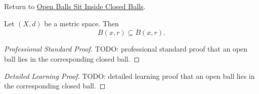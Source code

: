 \newpage
{}
\label{prf:fv-msml-ball-subset-closed-ball}

\begin{remark*}[Return]
Return to \hyperref[thm:fv-msml-ball-subset-closed-ball]{Open Balls Sit Inside Closed Balls}.
\end{remark*}

\begin{theorem*}
Let $(X,d)$ be a metric space. Then
\[
  B(x,r)\subseteq \overline{B}(x,r).
\]
\end{theorem*}

\begin{proof}[Professional Standard Proof]
\LRAProofBodyStart
TODO: professional standard proof that an open ball lies in the corresponding closed ball.
\end{proof}

\begin{proof}[Detailed Learning Proof]
\LRAProofBodyStart
TODO: detailed learning proof that an open ball lies in the corresponding closed ball.
\end{proof}

\begin{remark*}
\end{remark*}

\NoLocalDependencies

\clearpage

